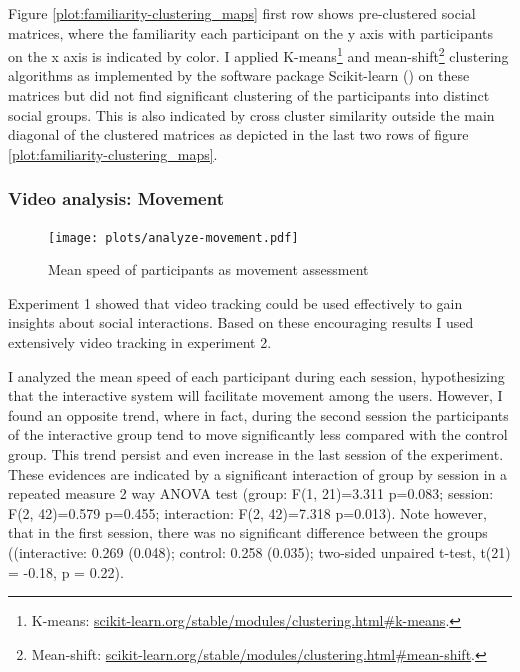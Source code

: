 \documentclass[a4paper,11pt]{article}
\begin{document}
{Figure \ref{plot:familiarity-clustering_maps} first row shows pre-clustered social matrices, where the familiarity each participant on the y axis with participants on the x axis is indicated by color.
I applied K-means\footnote{K-means: \href{http://scikit-learn.org/stable/modules/clustering.html\#k-means}{scikit-learn.org/stable/modules/clustering.html\#k-means}.} and mean-shift\footnote{Mean-shift: \href{http://scikit-learn.org/stable/modules/clustering.html\#mean-shift}{scikit-learn.org/stable/modules/clustering.html\#mean-shift}.} clustering algorithms as implemented by the software package Scikit-learn (\cite{scikit-learn}) on these matrices but did not find significant clustering of the participants into distinct social groups.
This is also indicated by cross cluster similarity outside the main diagonal of the clustered matrices as depicted in the last two rows of figure \ref{plot:familiarity-clustering_maps}.

\subsubsection{Video analysis: Movement}

\begin{figure}[!htb]
    \centering
    \texttt{[image: plots/analyze-movement.pdf]}
    \caption{Mean speed of participants as movement assessment}\label{plot:analyze-movement}
\end{figure}

Experiment 1 showed that video tracking could be used effectively to gain insights about social interactions.
Based on these encouraging results I used extensively video tracking in experiment 2.

I analyzed the mean speed of each participant during each session, hypothesizing that the interactive system will facilitate movement among the users.
However, I found an opposite trend, where in fact, during the second session the participants of the interactive group tend to move significantly less compared with the control group.
This trend persist and even increase in the last session of the experiment.
These evidences are indicated by a significant interaction of group by session in a repeated measure 2 way ANOVA test (group: F(1, 21)=3.311 p=0.083; session: F(2, 42)=0.579 p=0.455; interaction: F(2, 42)=7.318 p=0.013).
Note however, that in the first session, there was no significant difference between the groups ((interactive: 0.269 (0.048); control: 0.258 (0.035); two-sided unpaired t-test, t(21) = -0.18, p = 0.22).

}
\end{document}
